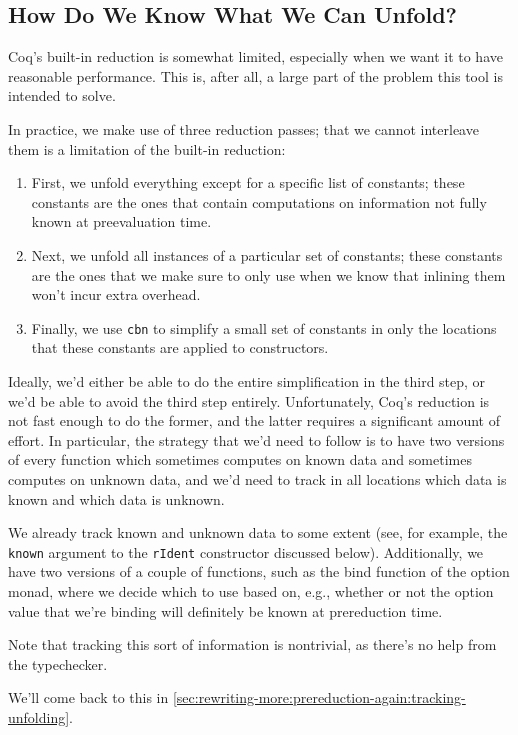\subsection{How Do We Know What We Can Unfold?}\label{sec:rewriting-more:prereduction:tracking-unfolding}
Coq's built-in reduction is somewhat limited, especially when we want it to have reasonable performance.
This is, after all, a large part of the problem this tool is intended to solve.

In practice, we make use of three reduction passes; that we cannot interleave them is a limitation of the built-in reduction:
\begin{enumerate}
\item First, we unfold everything except for a specific list of constants; these constants are the ones that contain computations on information not fully known at preevaluation time.
\item Next, we unfold all instances of a particular set of constants; these constants are the ones that we make sure to only use when we know that inlining them won't incur extra overhead.
\item Finally, we use \texttt{cbn} to simplify a small set of constants in only the locations that these constants are applied to constructors.
\end{enumerate}

Ideally, we'd either be able to do the entire simplification in the third step, or we'd be able to avoid the third step entirely.
Unfortunately, Coq's reduction is not fast enough to do the former, and the latter requires a significant amount of effort.
In particular, the strategy that we'd need to follow is to have two versions of every function which sometimes computes on known data and sometimes computes on unknown data, and we'd need to track in all locations which data is known and which data is unknown.

We already track known and unknown data to some extent (see, for example, the \texttt{known} argument to the \texttt{rIdent} constructor discussed below).
Additionally, we have two versions of a couple of functions, such as the bind function of the option monad, where we decide which to use based on, e.g., whether or not the option value that we're binding will definitely be known at prereduction time.

Note that tracking this sort of information is nontrivial, as there's no help from the typechecker.

We'll come back to this in \autoref{sec:rewriting-more:prereduction-again:tracking-unfolding}.

